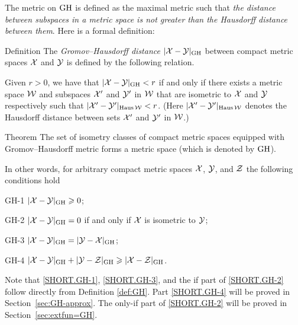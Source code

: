 The metric on $\operatorname{\rm GH}\nolimits$ is defined as the maximal metric such that \textit{the distance between subspaces in a metric space is not greater than the Hausdorff distance between them}.
Here is a formal definition:

\begin{thm}{Definition}\label{def:GH}
The \emph{Gromov--Hausdorff distance} $|\mathcal{X}-\mathcal{Y}|_{\operatorname{\rm GH}\nolimits}$ between compact metric spaces $\mathcal{X}$ and $\mathcal{Y}$
is defined by the following
relation.
 
Given  $r > 0$, we have that $|\mathcal{X}-\mathcal{Y}|_{\operatorname{\rm GH}\nolimits} < r$ if and only if there exists a metric
space $\mathcal{W}$ and subspaces $\mathcal{X}'$ and $\mathcal{Y}'$ in $\mathcal{W}$ that are isometric to $\mathcal{X}$ and $\mathcal{Y}$
respectively such that $|\mathcal{X}'-\mathcal{Y}'|_{\operatorname{\rm Haus}\nolimits\mathcal{W}} < r$. 
(Here $|\mathcal{X}'-\mathcal{Y}'|_{\operatorname{\rm Haus}\nolimits\mathcal{W}}$ denotes the Hausdorff distance between sets $\mathcal{X}'$ and $\mathcal{Y}'$ in $\mathcal{W}$.)
\end{thm}

\begin{thm}{Theorem}\label{thm:GH-is-a-metric}
The set of isometry classes of compact metric spaces equipped with Gromov--Hausdorff metric forms a metric space (which is denoted by $\operatorname{\rm GH}\nolimits$).

In other words, for arbitrary compact metric spaces $\mathcal{X}$, $\mathcal{Y}$, and $\mathcal{Z}$ the following conditions hold

\begin{subthm}{GH-1} $|\mathcal{X}-\mathcal{Y}|_{\operatorname{\rm GH}\nolimits}\geqslant 0$;
\end{subthm}

\begin{subthm}{GH-2} $|\mathcal{X}-\mathcal{Y}|_{\operatorname{\rm GH}\nolimits}=0$ if and only if $\mathcal{X}$ is isometric to $\mathcal{Y}$;
\end{subthm}

\begin{subthm}{GH-3} $|\mathcal{X}-\mathcal{Y}|_{\operatorname{\rm GH}\nolimits}=|\mathcal{Y}-\mathcal{X}|_{\operatorname{\rm GH}\nolimits}$;
\end{subthm}

\begin{subthm}{GH-4} $|\mathcal{X}-\mathcal{Y}|_{\operatorname{\rm GH}\nolimits}+|\mathcal{Y}-\mathcal{Z}|_{\operatorname{\rm GH}\nolimits}\geqslant |\mathcal{X}-\mathcal{Z}|_{\operatorname{\rm GH}\nolimits}$.
\end{subthm}
\end{thm}


Note that \ref{SHORT.GH-1}, \ref{SHORT.GH-3},
and the if part of \ref{SHORT.GH-2} follow directly from Definition \ref{def:GH}.
Part \ref{SHORT.GH-4} will be proved in Section~\ref{sec:GH-approx}.
The only-if part of \ref{SHORT.GH-2} will be proved in Section~\ref{sec:extfun=GH}.

